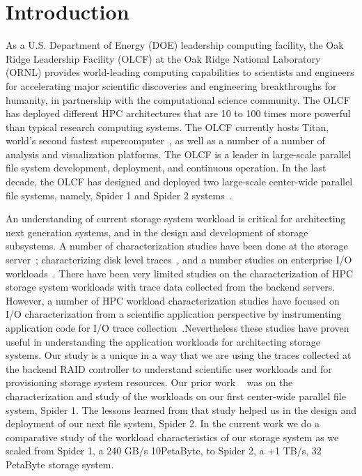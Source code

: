 \section{Introduction}
\label{sec:intro}

As a U.S. Department of Energy (DOE) leadership computing facility, the Oak
Ridge Leadership Facility (OLCF) at the Oak Ridge National Laboratory (ORNL)
provides world-leading computing capabilities to scientists and engineers for
accelerating major scientific discoveries and engineering breakthroughs for
humanity, in partnership with the computational science community. The OLCF has
deployed different HPC architectures that are 10 to 100 times more powerful
than typical research computing systems. The OLCF currently hosts Titan,
world's second fastest supercomputer~\cite{titan}, as well as a number of a
number of analysis and visualization platforms. The OLCF is a leader in large-scale
parallel file system development, deployment, and continuous operation. In the
last decade, the OLCF has designed and deployed two large-scale center-wide
parallel file systems, namely, Spider 1 and Spider 2 systems~\cite{spider1,
spider2}.

An understanding of current storage system workload is critical for
architecting next generation systems, and in the design and development of
storage subsystems. A number of characterization studies have been done at the
storage server~\cite{hpca04:zhang, iiswc08:swaroop}; characterizing disk level
traces~\cite{ sigmetrics09:alma}, and a number studies on enterprise I/O
workloads~\cite{gmach2007workload, hpca04:zhang}. There have been very limited
studies on the characterization of HPC storage system workloads with trace data
collected from the backend servers. However, a number of HPC workload
characterization studies have focused on I/O characterization from a scientific
application perspective by instrumenting application code for I/O trace
collection~\cite{ iasds09:philip, shan2008characterizing}.Nevertheless these
studies have proven useful in understanding the application workloads for
architecting storage systems. Our study is a unique in a way that we are using
the traces collected at the backend RAID controller to understand scientific
user workloads and for provisioning storage system resources. Our prior work
~\cite{ spider1-workload} was on the characterization and study of the
workloads on our first center-wide parallel file system, Spider 1. The lessons
learned from that study helped us in the design and deployment of our next file
system, Spider 2. In the current work we do a comparative study of the workload
characteristics of our storage system as we scaled from Spider 1, a 240 GB/s
10PetaByte, to Spider 2, a +1 TB/s, 32 PetaByte storage system.

